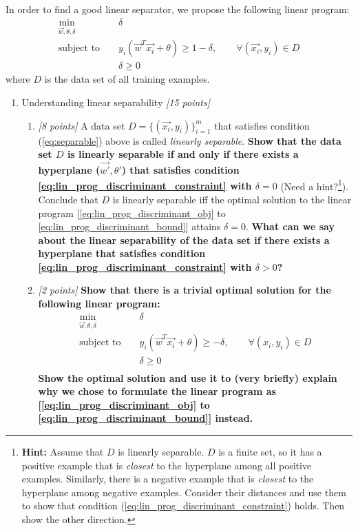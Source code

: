 \begin{enumerate}
In order to find a good linear separator, we propose the following linear program:
\begin{eqnarray}
  \min_{\vec{w}, \theta, \delta} & & \delta  \label{eq:lin_prog_discriminant_obj}\\
 \textrm{subject to } & & y_i(\vec{w}^T \vec{x_i} + \theta) \geq 1 - \delta, \qquad \forall (\vec{x_i},y_i) \in D  \label{eq:lin_prog_discriminant_constraint}\\
  & & \delta \geq 0  \label{eq:lin_prog_discriminant_bound}
\end{eqnarray}
where $D$ is the data set of all training examples.
\begin{enumerate}


\item[a.] Understanding linear separability {\em [15 points]} 
  \begin{enumerate}
  \item [a.1] {\em[8 points]} A data set
      $D=\{(\vec{x_i},y_i)\}_{i=1}^m$ that satisfies 
      condition (\ref{eq:separable}) above is called
      {\em linearly separable}. 
      {\bf Show that the data set
      $D$ is linearly separable 
      if and only if there exists
      a hyperplane ($\vec{w'}, \theta'$) that satisfies 
      condition
      \eqref{eq:lin_prog_discriminant_constraint} with $\delta = 0$} 
	  (Need a hint?\footnote{{\bf Hint:} Assume that $D$ is linearly separable. $D$ is a
      finite set, so it has a positive example that is {\em closest}
      to the hyperplane among all positive examples. Similarly, there
      is a negative example that is {\em closest} to the hyperplane
      among negative examples. Consider their distances and use them
      to show that condition
      (\ref{eq:lin_prog_discriminant_constraint}) holds. Then show the
      other direction.
	  }).
      Conclude that $D$ is linearly separable iff the optimal solution
      to the linear program
      [\eqref{eq:lin_prog_discriminant_obj} to \eqref{eq:lin_prog_discriminant_bound}]
      attains $\delta = 0$.
      {\bf What can we say about the linear separability of the data set
      if there exists a hyperplane that satisfies condition
      \eqref{eq:lin_prog_discriminant_constraint} with $\delta > 0$?}

  \item [a.2] {\em [2 points]} {\bf Show that there is a
      trivial optimal solution for the following linear
      program:}
    \begin{eqnarray*}
      \min_{\vec{w},\theta,\delta} & & \delta  \\
      \textrm{subject to } & & y_i(\vec{w}^T \vec{x_i} + \theta) \geq - \delta, \qquad \forall (x_i,y_i) \in D \\
      && \delta \geq 0  \\
    \end{eqnarray*}
	{\bf Show the optimal solution and use it to (very briefly)
	explain why we chose to formulate the linear program as
	[\eqref{eq:lin_prog_discriminant_obj} to \eqref{eq:lin_prog_discriminant_bound}]
	instead.}


\end{enumerate}
\end{enumerate}
\end{enumerate}
